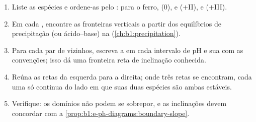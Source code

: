 \begin{method}\label{met:b1:e-ph-diagrams:build}
\begin{enumerate}
  \item Liste as espécies e ordene-as pelo : para o
        ferro,  (0),  e  ($+$II), 
        e  ($+$III).
  \item Em cada , encontre as fronteiras verticais a
        partir dos equilíbrios de precipitação (ou ácido--base) na
         (\cref{ch:b1:precipitation}).
  \item Para cada par de  vizinhos, escreva a
         em cada intervalo de pH e sua  com
        as convenções; isso dá uma fronteira reta de inclinação
        conhecida.
  \item Reúna as retas da esquerda para a direita; onde três retas se
        encontram, cada uma só continua do lado em que suas duas espécies
        são ambas estáveis.
  \item Verifique: os domínios não podem se sobrepor, e as inclinações
        devem concordar com a \cref{prop:b1:e-ph-diagrams:boundary-slope}.
\end{enumerate}
\end{method}

